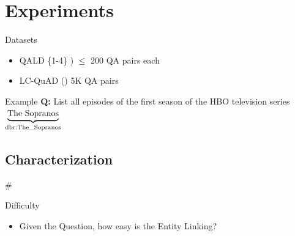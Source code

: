 \documentclass[]{beamer}
\def\mAlertSpace{\vspace{0.5em}}
\newcommand{\mSlideTitle}{{{\color{gray}\secname}} \# \subsecname}
\begin{document}
\section{Experiments}
  \begin{frame}{\secname}
    \begin{alertblock}{Datasets}
      \begin{itemize}
        \item QALD \{1-4\} \cite{Unger2014}) $\le$ 200 QA pairs each
        \item LC-QuAD (\cite{trivedi2017lc}) 5K QA pairs
      \end{itemize}
    \end{alertblock}
    \begin{alertblock}{Example}
      \mAlertSpace
      \textbf{Q:} List all episodes of the first season of the HBO television series
      $\underbrace{\text{The Sopranos}}_\text{\scriptsize dbr:The\_Sopranos}$
    \end{alertblock}
  \end{frame}

\subsection{Characterization}
  \begin{frame}{\mSlideTitle}
    \begin{alertblock}{Difficulty}
      \begin{itemize}
        \item Given the Question, how easy is the Entity Linking?
      \end{itemize}
      
    \end{alertblock}
  \end{frame}
\end{document}
